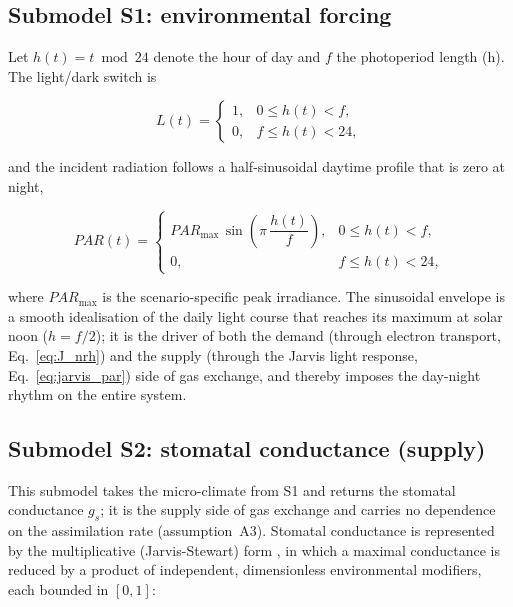 \documentclass[a4paper,fleqn]{cas-sc}
\begin{document}
\subsection{Submodel S1: environmental forcing}
\label{sec:forcing}

Let $h(t)=t \bmod 24$ denote the hour of day and $f$ the photoperiod
length (h). The light/dark switch is

\begin{equation}
L(t) =
\begin{cases}
1, & 0 \leq h(t) < f, \\[2pt]
0, & f \leq h(t) < 24,
\end{cases}
\label{eq:photoperiod}
\end{equation}

and the incident radiation follows a half-sinusoidal daytime profile that is
zero at night,

\begin{equation}
\mathit{PAR}(t) =
\begin{cases}
\mathit{PAR}_{\max}\,
\sin\!\left(\pi\,\dfrac{h(t)}{f}\right), & 0 \leq h(t) < f, \\[8pt]
0, & f \leq h(t) < 24,
\end{cases}
\label{eq:par_profile}
\end{equation}

where $\mathit{PAR}_{\max}$ is the scenario-specific peak irradiance. The
sinusoidal envelope is a smooth idealisation of the daily light course
that reaches its maximum at solar noon ($h=f/2$); it is the driver of both
the demand (through electron transport, Eq.~\eqref{eq:J_nrh}) and the
supply (through the Jarvis light response, Eq.~\eqref{eq:jarvis_par}) side
of gas exchange, and thereby imposes the day-night rhythm on the entire system.

\subsection{Submodel S2: stomatal conductance (supply)}
\label{sec:jarvis}

This submodel takes the micro-climate from S1 and returns the stomatal
conductance $g_s$; it is the supply side of gas exchange and carries no
dependence on the assimilation rate (assumption~A3). Stomatal conductance
is represented by the multiplicative (Jarvis-Stewart) form
\citep{Jarvis1976,Damour2010}, in which a maximal conductance is reduced by
a product of independent, dimensionless environmental modifiers, each
bounded in $[0,1]$:
\end{document}
